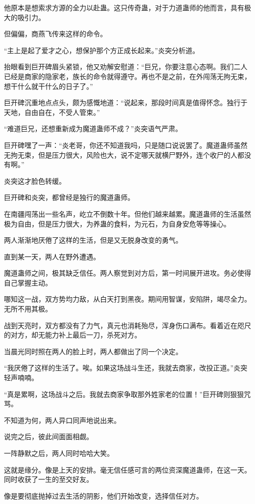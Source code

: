 \begin{this_body}
他原本是想索求方源的全力以赴蛊。这只传奇蛊，对于力道蛊师的他而言，具有极大的吸引力。

但偏偏，商燕飞传来这样的命令。

“主上是起了爱才之心，想保护那个方正成长起来。”炎突分析道。

抬眼看到巨开碑眉头紧锁，他又劝解安慰道：“巨兄，你要注意心态啊。我们二人已经是商家的隐家老，族长的命令就得遵守。再也不是之前，在外闯荡无拘无束，想干什么就干什么的日子了。”

巨开碑沉重地点点头，颇为感慨地道：“说起来，那段时间真是值得怀念。独行于天地，自由自在，不受人管束。”

“难道巨兄，还想重新成为魔道蛊师不成？”炎突语气严肃。

巨开碑嘿了一声：“炎老哥，你还不知道我吗，只是随口说说罢了。魔道蛊师虽然无拘无束，但是压力很大，风险也大，说不定哪天就横尸野外，连个收尸的人都没有啊。”

炎突这才脸色转缓。

巨开碑和炎突，都曾经是独行的魔道蛊师。

在南疆闯荡出一些名声，屹立不倒数十年。但他们越来越累。魔道蛊师的生活虽然极为自由，但是压力很大，为养蛊的食料，为元石，为自身安危等等操心。

两人渐渐地厌倦了这样的生活，但是又无脱身改变的勇气。

直到某一天，两人在野外遭遇。

魔道蛊师之间，极其缺乏信任。两人察觉到对方后，第一时间展开进攻。务必使得自己掌握主动。

哪知这一战，双方势均力敌，从白天打到黑夜。期间用智谋，安陷阱，竭尽全力。无所不用其极。

战到天亮时，双方都没有了力气，真元也消耗殆尽，浑身伤口满布。看着近在咫尺的对方，却无能力补上最后一刀，杀死对方。

当晨光同时照在两人的脸上时，两人都做出了同一个决定。

“我厌倦了这样的生活了。唉。如果这场战斗生还，我就去商家，改投正道。”炎突轻声喃喃。

“真是累啊，这场战斗之后。我就去商家争取那外姓家老的位置！”巨开碑则狠狠咒骂。

不知道为何，两人异口同声地说出来。

说完之后，彼此间面面相觑。

一阵静默之后，两人同时哈哈大笑。

这就是缘分。像是上天的安排。毫无信任感可言的两位资深魔道蛊师，在这一天。同时收获了一生的至交好友。

像是要彻底抛掉过去生活的阴影，他们开始改变，选择信任对方。


\end{this_body}
